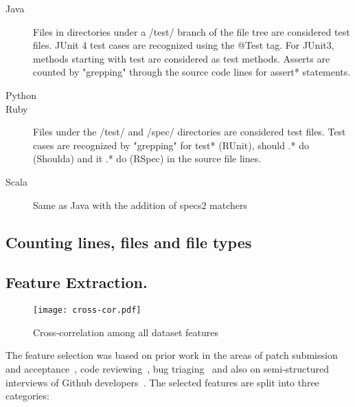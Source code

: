 \documentclass{sig-alternate}
\begin{document}
\begin{description}

  \item[Java]  Files in directories under a /test/ branch of the file tree are considered test files. JUnit 4 test cases are recognized using the @Test tag. For JUnit3, methods starting with test are considered as test methods. Asserts are counted by "grepping" through the source code lines for assert* statements.

  \item[Python]

  \item[Ruby] Files under the /test/ and /spec/ directories are considered test files. Test cases are recognized by "grepping" for test* (RUnit), should .* do (Shoulda) and it .* do (RSpec) in the source file lines.


  \item[Scala] Same as Java with the addition of specs2 matchers

\end{description}

\subsection{Counting lines, files and file types}

\subsection{Feature Extraction.} 

\begin{figure}
  \begin{center}
    \texttt{[image: cross-cor.pdf]}
  \end{center}
  \caption{Cross-correlation among all dataset features}
  \label{fig:wordcloud}
\end{figure}


The feature selection was based on prior work in the areas of patch submission
and acceptance~\cite{Nagap05,Bird07a,Weiss08,Baysa12}, code
reviewing~\cite{Rigby13}, bug triaging~\cite{Anvik06, Giger10} and also on
semi-structured interviews of Github developers~\cite{Dabbi12, Pham13, McDon13}.
The selected features are split into three categories:
\end{document}
